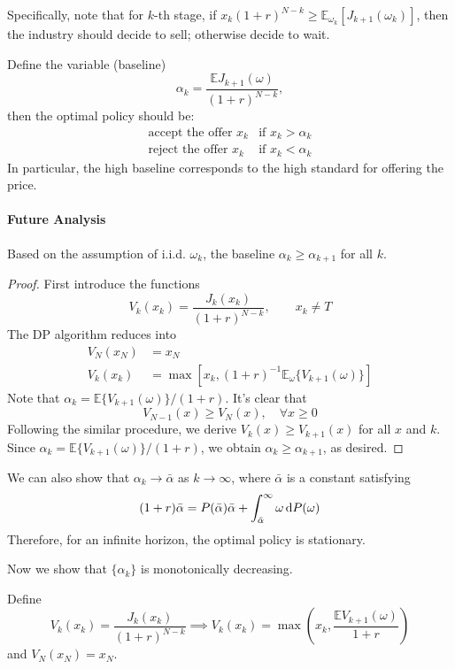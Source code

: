 Specifically, note that for $k$-th stage, if $x_k(1+r)^{N-k}\ge \mathbb{E}_{\omega_k}[J_{k+1}(\omega_k)]$, then the industry should decide to sell; otherwise decide to wait.

Define the variable (baseline)
\[
\alpha_k=\frac{\mathbb{E}J_{k+1}(\omega)}{(1+r)^{N-k}},
\]
then the optimal policy should be:
\[
\begin{array}{ll}
\text{accept the offer $x_k$}&\text{if $x_k>\alpha_k$}\\
\text{reject the offer $x_k$}&\text{if $x_k<\alpha_k$}
\end{array}
\]
In particular, the high baseline corresponds to the high standard for offering the price.

\paragraph{Future Analysis}
\begin{theorem}
Based on the assumption of i.i.d. $\omega_k$, the baseline $\alpha_k\ge\alpha_{k+1}$ for all $k$.
\end{theorem}
\begin{proof}
First introduce the functions
\[
V_k(x_k) = \frac{J_k(x_k)}{(1+r)^{N-k}},\qquad
x_k\ne T
\]
The DP algorithm reduces into 
\begin{align*}
V_N(x_N)&=x_N\\
V_k(x_k)&=\max\left[x_k,(1+r)^{-1}\mathbb{E}_{\omega}\{V_{k+1}(\omega)\}\right]
\end{align*}
Note that $\alpha_k = \mathbb{E}\{V_{k+1}(\omega)\}/(1+r)$. It's clear that
\[
V_{N-1}(x)\ge V_N(x),\quad\forall x\ge0
\]
Following the similar procedure, we derive $V_k(x)\ge V_{k+1}(x)$ for all $x$ and $k$. Since $\alpha_k = \mathbb{E}\{V_{k+1}(\omega)\}/(1+r)$, we obtain $\alpha_k\ge\alpha_{k+1}$, as desired.

\end{proof}
\begin{remark}
We can also show that $\alpha_k\to\bar{\alpha}$ as $k\to\infty$, where $\bar{\alpha}$ is a constant satisfying
\[
(1+r)\bar{\alpha} = P(\bar{\alpha})\bar{\alpha}+\int_{\bar{\alpha}}^\infty\omega \,\mathrm{d} P(\omega)
\]
Therefore, for an infinite horizon, the optimal policy is stationary.
\end{remark}



Now we show that $\{\alpha_k\}$ is monotonically decreasing.

Define 
\[
V_k(x_k) = \frac{J_k(x_k)}{(1+r)^{N-k}}
\implies
V_k(x_k) = \max\left(x_k,\frac{\mathbb{E}V_{k+1}(\omega)}{1+r}\right)
\]
and $V_N(x_N) = x_N$.

